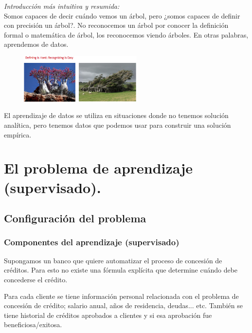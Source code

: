 \documentclass[11pt,a4paper]{article}
\theoremstyle{definition}
\begin{document}
	 \textit{Introducción más intuitiva y resumida:}\\
	 Somos capaces de decir cuándo vemos un árbol, pero ¿somos capaces de definir con precisión un árbol?. No reconocemos un árbol por conocer la definición formal o matemática de árbol, los reconocemos viendo árboles. En otras palabras, aprendemos de datos.
	\begin{figure}[h!]
	\centering
	\includegraphics[width=0.55\textwidth]{images/img1_tree}
	\end{figure}
	
	El aprendizaje de datos se utiliza en situaciones donde no tenemos solución analítica, pero tenemos datos que podemos usar para construir una solución empírica.\\
	 
	 

	 
	\section{El problema de aprendizaje (supervisado).}
	
	\subsection{Configuración del problema}
	
	\subsubsection{Componentes del aprendizaje (supervisado)}
		Supongamos un banco que quiere automatizar el proceso de concesión de créditos. Para esto no existe una fórmula explícita que determine cuándo debe concederse el crédito. 
		
		Para cada cliente se tiene información personal relacionada con el problema de concesión de crédito; salario anual, años de residencia, deudas... etc. También se tiene historial de créditos aprobados a clientes y si esa aprobación fue beneficiosa/exitosa.\\
		
\end{document}
